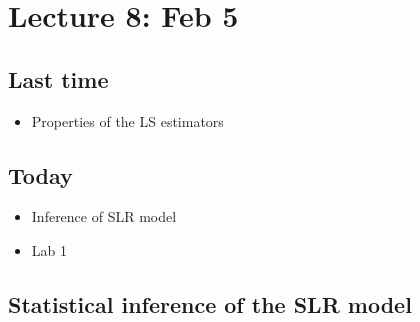 \setcounter{section}{7}


\section{Lecture 8: Feb 5}


\subsection*{Last time}
\begin{itemize}
  \item Properties of the LS estimators
\end{itemize}


\subsection*{Today}
\begin{itemize}
  \item Inference of SLR model
  \item Lab 1
\end{itemize}


\subsection*{Statistical inference of the SLR model}


